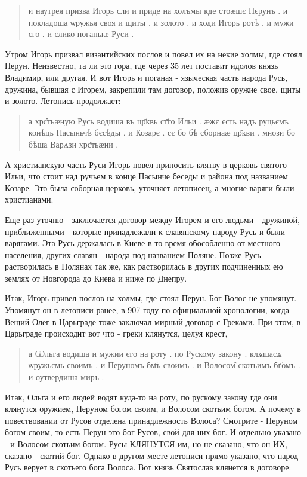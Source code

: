 \documentclass[a5paper,11pt,openany]{article}
\begin{document}
\begin{quotation}
\noindent и наутрея призва Игорь сли и приде на холъмы кде стоӕшє Пєрунъ . и покладоша
ѡружья своя и щиты . и золото . 
и ходи Игорь ротѣ . и мужи єго . и єлико
поганыӕ Руси .
\end{quotation} 

Утром Игорь призвал византийских послов и повел их на некие холмы, где стоял Перун. Неизвестно, та ли это гора, где через 35 лет поставит идолов князь Владимир, или другая. И вот Игорь и поганая - языческая часть народа Русь, дружина, бывшая с Игорем, закрепили там договор, положив оружие свое, щиты и золото. 
Летопись продолжает:


\begin{quotation}
\noindent а хрс̑тьӕную Русь водиша въ цр҃квь ст҃го Ильи . ӕжє єсть надъ руцьємъ  конѣць Пасыньчѣ  бєсѣды . и Козарє . сє бо бѣ сборнаӕ цр҃кви .
мнози бо бѣша Варѧзи хрс̑тьӕни . 
\end{quotation}

А христианскую часть Руси Игорь повел приносить клятву в церковь святого Ильи, что стоит над ручьем в конце Пасынче беседы и района под названием Козаре. Это была соборная церковь, уточняет летописец, а многие варяги были христианами.

   Еще раз уточню - заключается договор между Игорем и его людьми - дружиной, приближенными - которые принадлежали к славянскому народу Русь и были варягами. Эта Русь держалась в Киеве в то время обособленно от местного населения, других славян - народа под названием Поляне. Позже Русь растворилась в Полянах так же, как растворилась в других подчиненных ею землях от Новгорода до Киева и ниже по Днепру.

    Итак, Игорь привел послов на холмы, где стоял Перун. Бог Волос не упомянут. Упомянут он в летописи ранее, в 907 году по официальной хронологии, когда Вещий Олег в Царьграде тоже заключал мирный договор с Греками. При этом, в Царьграде происходит вот что - греки клянутся, целуя крест, 

\begin{quotation}
\noindent а Ѡльга водиша и мужии єго на роту . по Рускому закону . клѧшасѧ ѡружьємь своимъ . и Перуномъ бм҃ъ своимъ . и Волосом̑
скотьимъ бг҃омъ . и оутвердиша миръ .\end{quotation}

Итак, Ольга и его людей водят куда-то на роту, по рускому закону где они клянутся оружием, Перуном богом своим, и Волосом скотьим богом. 
   А почему в повествовании от Русов отделена принадлежность Волоса? Смотрите - Перуном богом своим, то есть Перун это бог Русов, свой для них бог. И отдельно указано - и Волосом скотьим богом. Русы КЛЯНУТСЯ им, но не сказано, что он ИХ, сказано - скотий бог.
    Однако в другом месте летописи прямо указано, что народ Русь верует в скотьего бога Волоса. Вот князь Святослав клянется в договоре:
\end{document}
